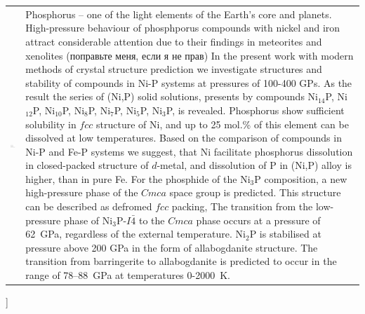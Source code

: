 \documentclass[twoside,twocolumn,9pt]{article}
\begin{document}
\begin{@twocolumnfalse}
\begin{tabular}{m{4.5cm} p{13.5cm} }
\includegraphics{head_foot/dates} & \noindent\normalsize{
%
Phosphorus – one of the light elements of the Earth's core and planets.
High-pressure behaviour of phosphporus compounds with nickel and iron attract considerable attention due to their findings in meteorites and xenolites {\color{red}(поправьте меня, если я не прав)}
In the present work with modern methods of crystal structure prediction we investigate structures and stability of compounds in Ni-P systems at pressures of 100-400 GPs.
As the result the series of (Ni,P) solid solutions, presents by compounds Ni$_{14}$P, Ni$_{12}$P, Ni$_{10}$P, Ni$_8$P, Ni$_7$P, Ni$_5$P, Ni$_3$P, is revealed.
Phosphorus show sufficient solubility in $fcc$ structure of Ni, and up to 25 mol.\% of this element can be dissolved at low temperatures.
Based on the comparison of compounds in Ni-P and Fe-P systems we suggest, that Ni facilitate phosphorus dissolution in closed-packed structure of $d$-metal, and dissolution of P in (Ni,P) alloy is higher, than in pure Fe.
For the phosphide of the Ni$_3$P composition, a new high-pressure phase of the $Cmca$ space group is predicted. 
This structure can be described as defromed $fcc$ packing,
The transition from the low-pressure phase of Ni$_3$P-$I\bar{4}$ to the $Cmca$ phase occurs at a pressure of 62~GPa, regardless of the external temperature. 
Ni$_2$P is stabilised at pressure above 200 GPa in the form of allabogdanite structure.
The transition from barringerite to allabogdanite is predicted to occur in the range of 78--88~GPa at temperatures 0-2000~K. 


%
} \\%

\end{tabular}

 \end{@twocolumnfalse} \vspace{0.6cm}

]

\renewcommand*\rmdefault{bch}\normalfont\upshape
\rmfamily
\end{document}
